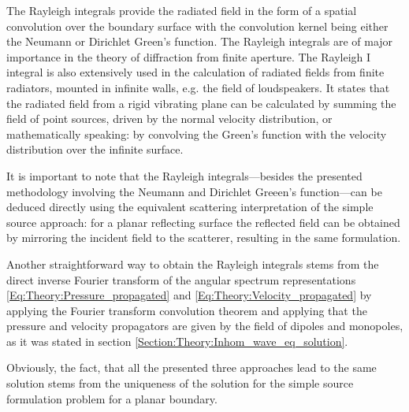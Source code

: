 The Rayleigh integrals provide the radiated field in the form of a spatial convolution over the boundary surface with the convolution kernel being either the Neumann or 
Dirichlet Green's function.
The Rayleigh integrals are of major importance in the theory of diffraction from finite aperture. 
The Rayleigh I integral is also extensively used in the calculation of radiated fields from finite radiators, mounted in infinite walls, e.g. the field of loudspeakers. It states that the radiated field from a rigid vibrating plane can be calculated by summing the field of point sources, driven by the normal velocity distribution, or mathematically speaking: by convolving the Green's function with the velocity distribution over the infinite surface.

\vspace{3mm}
It is important to note that the Rayleigh integrals---besides the presented methodology involving the Neumann and Dirichlet Greeen's function---can be deduced directly using the equivalent scattering interpretation of the simple source approach: for a planar reflecting surface the reflected field can be obtained by mirroring the incident field to the scatterer, resulting in the same formulation.

Another straightforward way to obtain the Rayleigh integrals stems from the direct inverse Fourier transform of the angular spectrum representations
\eqref{Eq:Theory:Pressure_propagated} and \eqref{Eq:Theory:Velocity_propagated} by applying the Fourier transform convolution theorem and applying that the pressure and velocity propagators are given by the field of dipoles and monopoles, as it was stated in section \ref{Section:Theory:Inhom_wave_eq_solution}.

Obviously, the fact, that all the presented three approaches lead to the same solution stems from the uniqueness of the solution for the simple source formulation problem for a planar boundary.